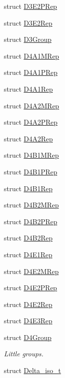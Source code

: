 \begin{DoxyCompactItemize}
\item 
struct \mbox{\hyperlink{structHadron_1_1D3E2PRep}{D3\+E2\+P\+Rep}}
\item 
struct \mbox{\hyperlink{structHadron_1_1D3E2Rep}{D3\+E2\+Rep}}
\item 
struct \mbox{\hyperlink{structHadron_1_1D3Group}{D3\+Group}}
\item 
struct \mbox{\hyperlink{structHadron_1_1D4A1MRep}{D4\+A1\+M\+Rep}}
\item 
struct \mbox{\hyperlink{structHadron_1_1D4A1PRep}{D4\+A1\+P\+Rep}}
\item 
struct \mbox{\hyperlink{structHadron_1_1D4A1Rep}{D4\+A1\+Rep}}
\item 
struct \mbox{\hyperlink{structHadron_1_1D4A2MRep}{D4\+A2\+M\+Rep}}
\item 
struct \mbox{\hyperlink{structHadron_1_1D4A2PRep}{D4\+A2\+P\+Rep}}
\item 
struct \mbox{\hyperlink{structHadron_1_1D4A2Rep}{D4\+A2\+Rep}}
\item 
struct \mbox{\hyperlink{structHadron_1_1D4B1MRep}{D4\+B1\+M\+Rep}}
\item 
struct \mbox{\hyperlink{structHadron_1_1D4B1PRep}{D4\+B1\+P\+Rep}}
\item 
struct \mbox{\hyperlink{structHadron_1_1D4B1Rep}{D4\+B1\+Rep}}
\item 
struct \mbox{\hyperlink{structHadron_1_1D4B2MRep}{D4\+B2\+M\+Rep}}
\item 
struct \mbox{\hyperlink{structHadron_1_1D4B2PRep}{D4\+B2\+P\+Rep}}
\item 
struct \mbox{\hyperlink{structHadron_1_1D4B2Rep}{D4\+B2\+Rep}}
\item 
struct \mbox{\hyperlink{structHadron_1_1D4E1Rep}{D4\+E1\+Rep}}
\item 
struct \mbox{\hyperlink{structHadron_1_1D4E2MRep}{D4\+E2\+M\+Rep}}
\item 
struct \mbox{\hyperlink{structHadron_1_1D4E2PRep}{D4\+E2\+P\+Rep}}
\item 
struct \mbox{\hyperlink{structHadron_1_1D4E2Rep}{D4\+E2\+Rep}}
\item 
struct \mbox{\hyperlink{structHadron_1_1D4E3Rep}{D4\+E3\+Rep}}
\item 
struct \mbox{\hyperlink{structHadron_1_1D4Group}{D4\+Group}}
\begin{DoxyCompactList}\small\item\em Little groups. \end{DoxyCompactList}\item 
struct \mbox{\hyperlink{structHadron_1_1Delta__iso__t}{Delta\+\_\+iso\+\_\+t}}

\end{DoxyCompactItemize}
